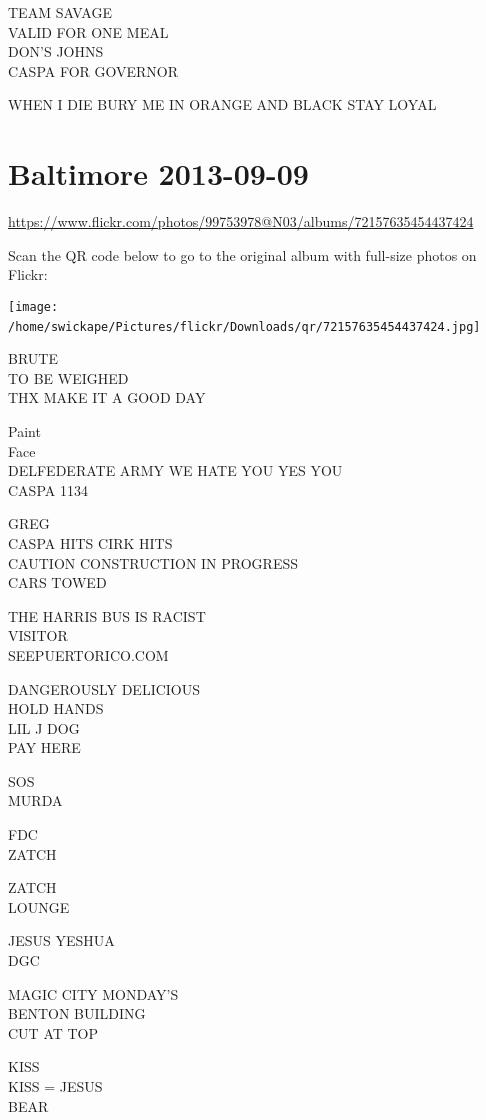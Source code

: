 \documentclass[10pt,letterpaper]{article}
\begin{document}
TEAM SAVAGE\\
VALID FOR ONE MEAL\\
DON'S JOHNS\\
CASPA FOR GOVERNOR

WHEN I DIE BURY ME IN ORANGE AND BLACK STAY LOYAL
\

\section*{Baltimore 2013-09-09}

\url{https://www.flickr.com/photos/99753978@N03/albums/72157635454437424}

Scan the QR code below to go to the original album with full-size photos on Flickr:

\texttt{[image: /home/swickape/Pictures/flickr/Downloads/qr/72157635454437424.jpg]}
\

BRUTE\\
TO BE WEIGHED\\
THX MAKE IT A GOOD DAY

Paint\\
Face\\
DELFEDERATE ARMY WE HATE YOU YES YOU\\
CASPA 1134

GREG\\
CASPA HITS CIRK HITS\\
CAUTION CONSTRUCTION IN PROGRESS\\
CARS TOWED

THE HARRIS BUS IS RACIST\\
VISITOR\\
SEEPUERTORICO.COM

DANGEROUSLY DELICIOUS\\
HOLD HANDS\\
LIL J DOG\\
PAY HERE

SOS\\
MURDA

FDC\\
ZATCH

ZATCH\\
LOUNGE

JESUS YESHUA\\
DGC

MAGIC CITY MONDAY'S\\
BENTON BUILDING\\
CUT AT TOP

KISS\\
KISS = JESUS\\
BEAR
\end{document}
